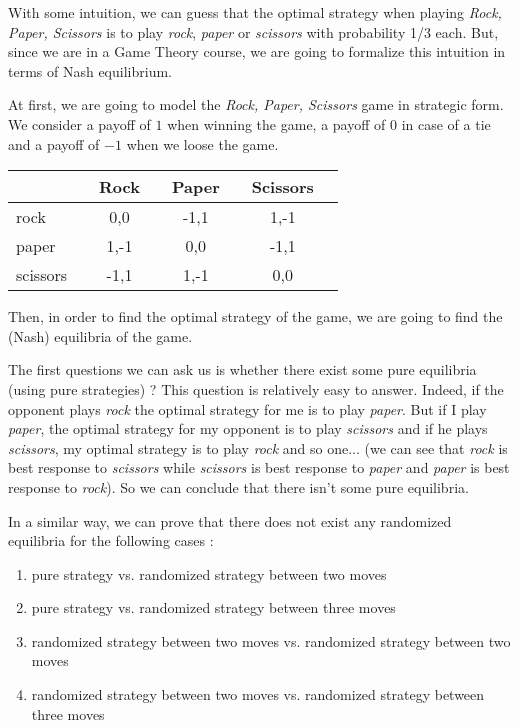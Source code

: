 With some intuition, we can guess that the optimal strategy when playing \textit{Rock, Paper, Scissors} is to play \textit{rock}, \textit{paper} or \textit{scissors} with probability 1/3 each. But, since we are in a Game Theory course, we are going to formalize this intuition in terms of Nash equilibrium.

At first, we are going to model the \textit{Rock, Paper, Scissors} game in strategic form. We consider a payoff of $1$ when winning the game, a payoff of $0$ in case of a tie and a payoff of $-1$ when we loose the game.
\begin{center}
\begin{tabular}[h!]{l|ccccccc}
	&& \Large{Rock} && \Large{Paper} && \Large{Scissors} & \\
	\hline
	\Large{rock} && \Large{0,0} && \Large{-1,1} && \Large{1,-1} & \\
	\Large{paper} && \Large{1,-1} && \Large{0,0} && \Large{-1,1} & \\
	\Large{scissors} && \Large{-1,1} && \Large{1,-1} && \Large{0,0} & \\
\end{tabular}
\end{center}

Then, in order to find the optimal strategy of the game, we are going to find the (Nash) equilibria of the game.

The first questions we can ask us is whether there exist some pure equilibria (using pure strategies) ? This question is relatively easy to answer. Indeed, if the opponent plays \textit{rock} the optimal strategy for me is to play \textit{paper}. But if I play \textit{paper}, the optimal strategy for my opponent is to play \textit{scissors} and if he plays \textit{scissors}, my optimal strategy is to play \textit{rock} and so one... (we can see that \textit{rock} is best response to \textit{scissors} while \textit{scissors} is best response to \textit{paper} and \textit{paper} is best response to \textit{rock}). So we can conclude that there isn't some pure equilibria.

In a similar way, we can prove that there does not exist any randomized equilibria for the following cases : 
\begin{enumerate}
\item pure strategy vs. randomized strategy between two moves
\item pure strategy vs. randomized strategy between three moves
\item randomized strategy between two moves vs. randomized strategy between two moves
\item randomized strategy between two moves vs. randomized strategy between three moves
\end{enumerate}

